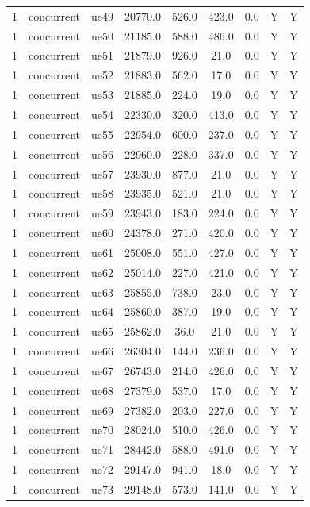 \begin{table}[ht]
\begin{tabular}{|c|c|c|c|c|c|c|c|c|}
1 & concurrent & ue49 & 20770.0 & 526.0 & 423.0 & 0.0 & Y & Y \\
1 & concurrent & ue50 & 21185.0 & 588.0 & 486.0 & 0.0 & Y & Y \\
1 & concurrent & ue51 & 21879.0 & 926.0 & 21.0 & 0.0 & Y & Y \\
1 & concurrent & ue52 & 21883.0 & 562.0 & 17.0 & 0.0 & Y & Y \\
1 & concurrent & ue53 & 21885.0 & 224.0 & 19.0 & 0.0 & Y & Y \\
1 & concurrent & ue54 & 22330.0 & 320.0 & 413.0 & 0.0 & Y & Y \\
1 & concurrent & ue55 & 22954.0 & 600.0 & 237.0 & 0.0 & Y & Y \\
1 & concurrent & ue56 & 22960.0 & 228.0 & 337.0 & 0.0 & Y & Y \\
1 & concurrent & ue57 & 23930.0 & 877.0 & 21.0 & 0.0 & Y & Y \\
1 & concurrent & ue58 & 23935.0 & 521.0 & 21.0 & 0.0 & Y & Y \\
1 & concurrent & ue59 & 23943.0 & 183.0 & 224.0 & 0.0 & Y & Y \\
1 & concurrent & ue60 & 24378.0 & 271.0 & 420.0 & 0.0 & Y & Y \\
1 & concurrent & ue61 & 25008.0 & 551.0 & 427.0 & 0.0 & Y & Y \\
1 & concurrent & ue62 & 25014.0 & 227.0 & 421.0 & 0.0 & Y & Y \\
1 & concurrent & ue63 & 25855.0 & 738.0 & 23.0 & 0.0 & Y & Y \\
1 & concurrent & ue64 & 25860.0 & 387.0 & 19.0 & 0.0 & Y & Y \\
1 & concurrent & ue65 & 25862.0 & 36.0 & 21.0 & 0.0 & Y & Y \\
1 & concurrent & ue66 & 26304.0 & 144.0 & 236.0 & 0.0 & Y & Y \\
1 & concurrent & ue67 & 26743.0 & 214.0 & 426.0 & 0.0 & Y & Y \\
1 & concurrent & ue68 & 27379.0 & 537.0 & 17.0 & 0.0 & Y & Y \\
1 & concurrent & ue69 & 27382.0 & 203.0 & 227.0 & 0.0 & Y & Y \\
1 & concurrent & ue70 & 28024.0 & 510.0 & 426.0 & 0.0 & Y & Y \\
1 & concurrent & ue71 & 28442.0 & 588.0 & 491.0 & 0.0 & Y & Y \\
1 & concurrent & ue72 & 29147.0 & 941.0 & 18.0 & 0.0 & Y & Y \\
1 & concurrent & ue73 & 29148.0 & 573.0 & 141.0 & 0.0 & Y & Y \\

\end{tabular}
\end{table}
